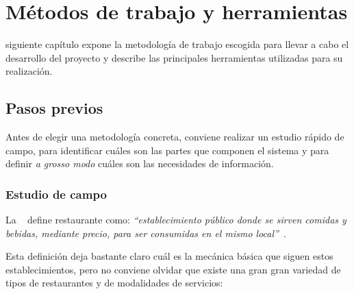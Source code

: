 
\chapter{Métodos de trabajo y herramientas}
\label{chap:methods}
 siguiente capítulo expone la metodología de trabajo escogida para
llevar a cabo el desarrollo del proyecto y describe las principales 
herramientas utilizadas para su realización.

\section{Pasos previos}
Antes de elegir una metodología concreta, conviene realizar un estudio rápido
de campo, para identificar cuáles son las partes que componen el sistema y para
definir \emph{a grosso modo} cuáles son las necesidades de información.

  \subsection{Estudio de campo}
  \label{sec:fieldStudy}
La ~\cite{bib:rae} define restaurante como: \emph{``establecimiento público 
donde se sirven comidas y bebidas, mediante precio, para ser consumidas en el
mismo local''}~\cite{bib:rae}.

Esta definición deja bastante claro cuál es la mecánica básica que siguen 
estos establecimientos, pero no conviene olvidar que existe una gran
gran variedad de tipos de restaurantes y de modalidades de servicios:

